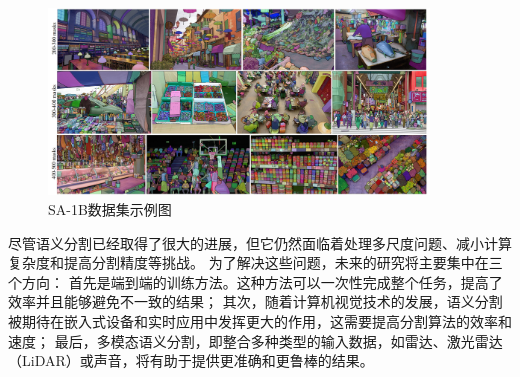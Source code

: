 \begin{figure}[htb]
	\centering
	\includegraphics[width=0.9\textwidth]{figures/sam_result.png}
	\caption{SA-1B数据集示例图}
	\label{fig:sa-1b}
\end{figure}

\par 尽管语义分割已经取得了很大的进展，但它仍然面临着处理多尺度问题、减小计算复杂度和提高分割精度等挑战。
为了解决这些问题，未来的研究将主要集中在三个方向：
首先是端到端的训练方法\cite{pspnet,deeplab3plus}。这种方法可以一次性完成整个任务，提高了效率并且能够避免不一致的结果；
其次，随着计算机视觉技术的发展，语义分割被期待在嵌入式设备和实时应用中发挥更大的作用，这需要提高分割算法的效率和速度；
最后，多模态语义分割，即整合多种类型的输入数据，如雷达、激光雷达（LiDAR）或声音，将有助于提供更准确和更鲁棒的结果\cite{SceneParsing,CascadedPyramidNetwork}。